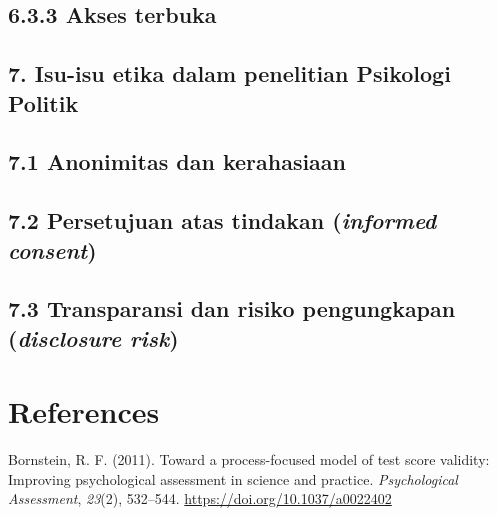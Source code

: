 \documentclass[
  english,
  man]{apa6}
\begin{document}
\hypertarget{akses-terbuka}{%
\subsection{6.3.3 Akses terbuka}\label{akses-terbuka}}

\hypertarget{isu-isu-etika-dalam-penelitian-psikologi-politik}{%
\subsection{7. Isu-isu etika dalam penelitian Psikologi Politik}\label{isu-isu-etika-dalam-penelitian-psikologi-politik}}

\hypertarget{anonimitas-dan-kerahasiaan}{%
\subsection{7.1 Anonimitas dan kerahasiaan}\label{anonimitas-dan-kerahasiaan}}

\hypertarget{persetujuan-atas-tindakan-informed-consent}{%
\subsection{\texorpdfstring{7.2 Persetujuan atas tindakan (\emph{informed consent})}{7.2 Persetujuan atas tindakan (informed consent)}}\label{persetujuan-atas-tindakan-informed-consent}}

\hypertarget{transparansi-dan-risiko-pengungkapan-disclosure-risk}{%
\subsection{\texorpdfstring{7.3 Transparansi dan risiko pengungkapan (\emph{disclosure risk})}{7.3 Transparansi dan risiko pengungkapan (disclosure risk)}}\label{transparansi-dan-risiko-pengungkapan-disclosure-risk}}

\newpage

\hypertarget{references}{%
\section{References}\label{references}}

\begingroup
\setlength{\parindent}{-0.5in}
\setlength{\leftskip}{0.5in}

\hypertarget{refs}{}
\leavevmode\hypertarget{ref-bornsteinProcessfocusedModelTest2011}{}%
Bornstein, R. F. (2011). Toward a process-focused model of test score validity: Improving psychological assessment in science and practice. \emph{Psychological Assessment}, \emph{23}(2), 532--544. \url{https://doi.org/10.1037/a0022402}
\end{document}
